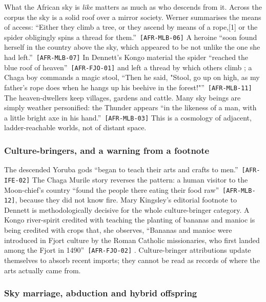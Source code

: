 \documentclass[11pt,a4paper]{article}
\newcommand{\pid}[1]{\texttt{\small #1}}
\begin{document}
What the African sky is \emph{like} matters as much as who descends from it. Across the corpus the sky is a solid roof over a mirror society. Werner summarises the means of access: \enquote{Either they climb a tree, or they ascend by means of a rope,[1] or the spider obligingly spins a thread for them.}~\pid{[AFR-MLB-06]} A heroine \enquote{soon found herself in the country above the sky, which appeared to be not unlike the one she had left.}~\pid{[AFR-MLB-07]} In Dennett's Kongo material the spider \enquote{reached the blue roof of heaven}~\pid{[AFR-FJO-01]} and left a thread by which others climb \parencite{dennett1898fjort}; a Chaga boy commands a magic stool, \enquote{Then he said, "Stool, go up on high, as my father's rope does when he hangs up his beehive in the forest!"}~\pid{[AFR-MLB-11]} The heaven-dwellers keep villages, gardens and cattle. Many sky beings are simply weather personified: the Thunder appears \enquote{in the likeness of a man, with a little bright axe in his hand.}~\pid{[AFR-MLB-03]} This is a cosmology of adjacent, ladder-reachable worlds, not of distant space.

\subsubsection{Culture-bringers, and a warning from a footnote}

The descended Yoruba gods \enquote{began to teach their arts and crafts to men.}~\pid{[AFR-IFE-02]} The Chaga Murile story reverses the pattern: a human visitor to the Moon-chief's country \enquote{found the people there eating their food raw}~\pid{[AFR-MLB-12]}, because they did not know fire. Mary Kingsley's editorial footnote to Dennett is methodologically decisive for the whole culture-bringer category. A Kongo river-spirit credited with teaching the planting of bananas and manioc is being credited with crops that, she observes, \enquote{Bananas and manioc were introduced in Fjort culture by the Roman Catholic missionaries, who first landed among the Fjort in 1490}~\pid{[AFR-FJO-02]} \parencite{dennett1898fjort}. Culture-bringer attributions update themselves to absorb recent imports; they cannot be read as records of where the arts actually came from.

\subsubsection{Sky marriage, abduction and hybrid offspring}
\end{document}
